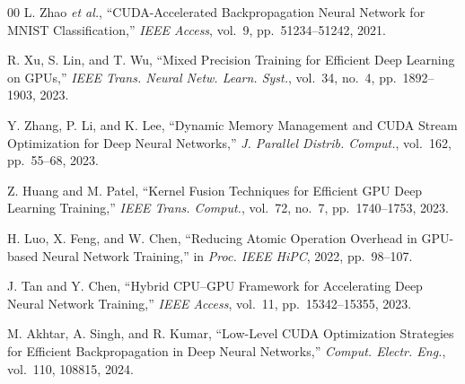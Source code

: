 \documentclass[conference]{IEEEtran}
\begin{document}
\begin{thebibliography}{00}
 L. Zhao \textit{et al.}, ``CUDA-Accelerated Backpropagation Neural Network for MNIST Classification,'' \textit{IEEE Access}, vol.~9, pp.~51234--51242, 2021.

 R. Xu, S. Lin, and T. Wu, ``Mixed Precision Training for Efficient Deep Learning on GPUs,'' \textit{IEEE Trans. Neural Netw. Learn. Syst.}, vol.~34, no.~4, pp.~1892--1903, 2023.

 Y. Zhang, P. Li, and K. Lee, ``Dynamic Memory Management and CUDA Stream Optimization for Deep Neural Networks,'' \textit{J. Parallel Distrib. Comput.}, vol.~162, pp.~55--68, 2023.

 Z. Huang and M. Patel, ``Kernel Fusion Techniques for Efficient GPU Deep Learning Training,'' \textit{IEEE Trans. Comput.}, vol.~72, no.~7, pp.~1740--1753, 2023.

 H. Luo, X. Feng, and W. Chen, ``Reducing Atomic Operation Overhead in GPU-based Neural Network Training,'' in \textit{Proc. IEEE HiPC}, 2022, pp.~98--107.

 J. Tan and Y. Chen, ``Hybrid CPU--GPU Framework for Accelerating Deep Neural Network Training,'' \textit{IEEE Access}, vol.~11, pp.~15342--15355, 2023.

 M. Akhtar, A. Singh, and R. Kumar, ``Low-Level CUDA Optimization Strategies for Efficient Backpropagation in Deep Neural Networks,'' \textit{Comput. Electr. Eng.}, vol.~110, 108815, 2024.

\end{thebibliography}
\end{document}

